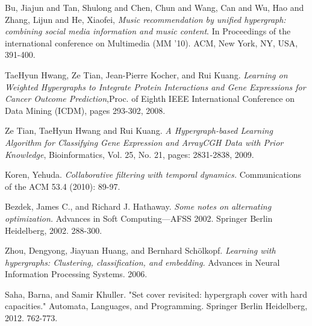 \documentclass[conference]{IEEEtran}
\begin{document}
\begin{thebibliography}{1}

Bu, Jiajun and Tan, Shulong and Chen, Chun and Wang, Can and Wu, Hao and Zhang, Lijun and He, Xiaofei,
\emph{Music recommendation by unified hypergraph: combining social media information and music content}.
In Proceedings of the international conference on Multimedia (MM '10). ACM, New York, NY, USA, 391-400.

TaeHyun Hwang, Ze Tian, Jean-Pierre Kocher, and Rui Kuang. \emph{Learning on Weighted Hypergraphs to Integrate Protein Interactions and Gene Expressions for Cancer Outcome Prediction},Proc. of Eighth IEEE International Conference on Data Mining (ICDM), pages 293-302, 2008.

Ze Tian, TaeHyun Hwang and Rui Kuang. \emph{A Hypergraph-based Learning Algorithm for Classifying Gene Expression and ArrayCGH Data with Prior Knowledge}, Bioinformatics, Vol. 25, No. 21, pages: 2831-2838, 2009. 

Koren, Yehuda. \emph{Collaborative filtering with temporal dynamics.} Communications of the ACM 53.4 (2010): 89-97.

Bezdek, James C., and Richard J. Hathaway. \emph{Some notes on alternating optimization.} Advances in Soft Computing—AFSS 2002. Springer Berlin Heidelberg, 2002. 288-300.

Zhou, Dengyong, Jiayuan Huang, and Bernhard Schölkopf. \emph{Learning with hypergraphs: Clustering, classification, and embedding.} Advances in Neural Information Processing Systems. 2006.

Saha, Barna, and Samir Khuller. "Set cover revisited: hypergraph cover with hard capacities." Automata, Languages, and Programming. Springer Berlin Heidelberg, 2012. 762-773.

\end{thebibliography}
\end{document}
